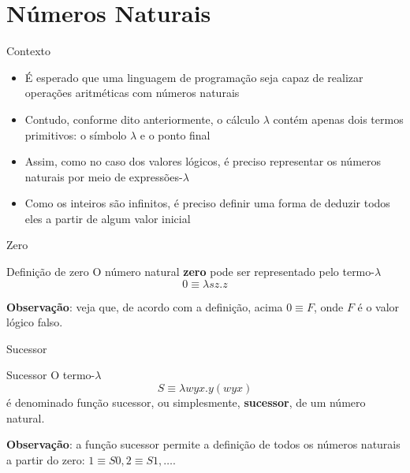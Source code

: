 \section{Números Naturais}

\begin{frame}[fragile]{Contexto}

    \begin{itemize}
        \item É esperado que uma linguagem de programação seja capaz de realizar operações
            aritméticas com números naturais

        \item Contudo, conforme dito anteriormente, o cálculo $\lambda$ contém apenas dois
            termos primitivos: o símbolo $\lambda$ e o ponto final

        \item Assim, como no caso dos valores lógicos, é preciso representar os números naturais
            por meio de expressões-$\lambda$

        \item Como os inteiros são infinitos, é preciso definir uma forma de deduzir todos eles
            a partir de algum valor inicial
    \end{itemize}

\end{frame}

\begin{frame}[fragile]{Zero}

    \begin{block}{Definição de zero}
        O número natural \textbf{zero} pode ser representado pelo termo-$\lambda$
        \[
            0 \equiv \lambda sz.z
        \]
    \end{block}

    \vspace{0.1in}

    \textbf{Observação}: veja que, de acordo com a definição, acima $0 \equiv F$, onde $F$ é o
        valor lógico falso.
\end{frame}

\begin{frame}[fragile]{Sucessor}

    \begin{block}{Sucessor}
        O termo-$\lambda$
        \[
            S \equiv \lambda wyx.y(wyx)
        \]
        é denominado função sucessor, ou simplesmente, \textbf{sucessor}, de um número
        natural.
    \end{block}

    \vspace{0.2in}

    \textbf{Observação}: a função sucessor permite a definição de todos os números naturais 
        a partir do zero: $1\equiv S0, 2\equiv S1, \ldots$.
\end{frame}

